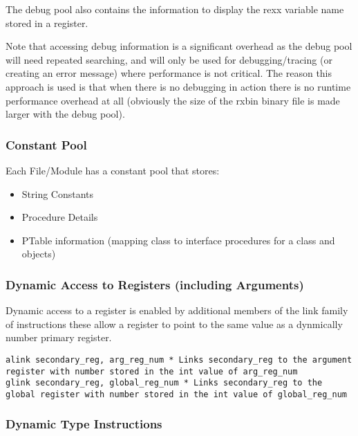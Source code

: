 The debug pool also contains the information to display the rexx variable name stored in a register.

Note that accessing debug information is a significant overhead as the debug pool will need repeated searching, and will only be used for debugging/tracing (or creating an error message) where performance is not critical. The reason this approach is used is that when there is no debugging in action there is no runtime performance overhead at all (obviously the size of the rxbin binary file is made larger with the debug pool).

\subsubsection{Constant Pool}

Each File/Module has a constant pool that stores:

\begin{itemize}
\item String Constants

\item Procedure Details

\item PTable information (mapping class to interface procedures for a class and objects)

\end{itemize}

\subsubsection{Dynamic Access to Registers (including Arguments)}

Dynamic access to a register is enabled by additional members of the link family of instructions these allow a register to point to the same value as a dynmically number primary register.

\begin{verbatim}
alink secondary_reg, arg_reg_num * Links secondary_reg to the argument register with number stored in the int value of arg_reg_num 
glink secondary_reg, global_reg_num * Links secondary_reg to the global register with number stored in the int value of global_reg_num 
\end{verbatim}

\subsubsection{Dynamic Type Instructions}

